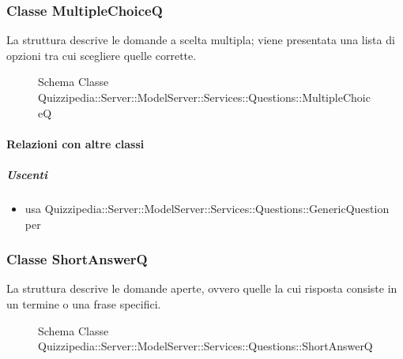 \subsubsection{Classe MultipleChoiceQ}
La struttura descrive le domande a scelta multipla; viene presentata una lista di opzioni tra cui scegliere quelle corrette.
\begin{figure}[H]
\centering
\noindent{}
\caption[Schema Classe MultipleChoiceQ]{Schema Classe Quizzipedia::Server::ModelServer::Services::Questions::MultipleChoiceQ}
\end{figure}
\paragraph{Relazioni con altre classi}
\subparagraph{Uscenti}
\begin{itemize}
\item usa Quizzipedia::Server::ModelServer::Services::Questions::GenericQuestion per 
\end{itemize}
\subsubsection{Classe ShortAnswerQ}
La struttura descrive le domande aperte, ovvero quelle la cui risposta consiste in un termine o una frase specifici.
\begin{figure}[H]
\centering
\noindent{}
\caption[Schema Classe ShortAnswerQ]{Schema Classe Quizzipedia::Server::ModelServer::Services::Questions::ShortAnswerQ}
\end{figure}
